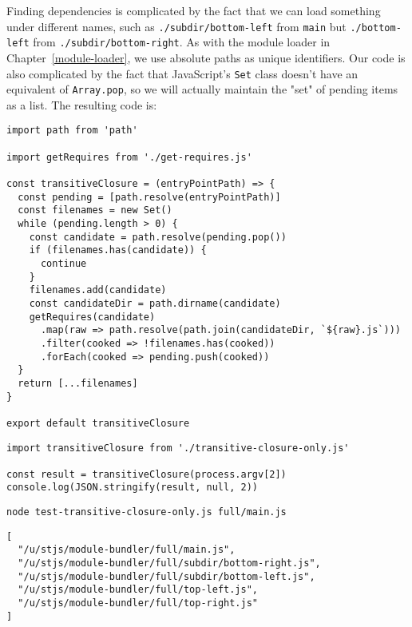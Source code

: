 \documentclass[krantzl]{krantz}
\newcommand{\chapref}[1]{Chapter~\ref{#1}}
\begin{document}
Finding dependencies is complicated by the fact that we can load something under different names,
such as \texttt{./subdir/bottom-left} from \texttt{main} but \texttt{./bottom-left} from \texttt{./subdir/bottom-right}.
As with the module loader in \chapref{module-loader},
we use absolute paths as unique identifiers.
Our code is also complicated by the fact that JavaScript's \texttt{Set} class doesn't have an equivalent of \texttt{Array.pop},
so we will actually maintain the "set" of pending items as a list.
The resulting code is:


\begin{lstlisting}[frame=single,frameround=tttt]
import path from 'path'

import getRequires from './get-requires.js'

const transitiveClosure = (entryPointPath) => {
  const pending = [path.resolve(entryPointPath)]
  const filenames = new Set()
  while (pending.length > 0) {
    const candidate = path.resolve(pending.pop())
    if (filenames.has(candidate)) {
      continue
    }
    filenames.add(candidate)
    const candidateDir = path.dirname(candidate)
    getRequires(candidate)
      .map(raw => path.resolve(path.join(candidateDir, `${raw}.js`)))
      .filter(cooked => !filenames.has(cooked))
      .forEach(cooked => pending.push(cooked))
  }
  return [...filenames]
}

export default transitiveClosure
\end{lstlisting}



\begin{lstlisting}[frame=single,frameround=tttt]
import transitiveClosure from './transitive-closure-only.js'

const result = transitiveClosure(process.argv[2])
console.log(JSON.stringify(result, null, 2))
\end{lstlisting}



\begin{lstlisting}[frame=single,frameround=tttt]
node test-transitive-closure-only.js full/main.js
\end{lstlisting}



\begin{lstlisting}[frame=single,frameround=tttt]
[
  "/u/stjs/module-bundler/full/main.js",
  "/u/stjs/module-bundler/full/subdir/bottom-right.js",
  "/u/stjs/module-bundler/full/subdir/bottom-left.js",
  "/u/stjs/module-bundler/full/top-left.js",
  "/u/stjs/module-bundler/full/top-right.js"
]
\end{lstlisting}
\end{document}
